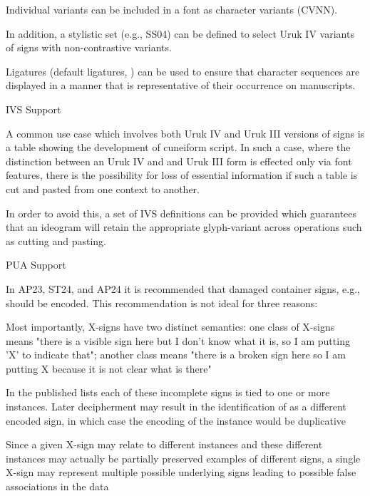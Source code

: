 \par Individual variants can be included in a font as character
      variants (CVNN).


\par In addition, a stylistic set (e.g., SS04) can
      be defined to select Uruk IV variants of signs with
      non-contrastive variants.


\par Ligatures (default ligatures, ) can be used
      to ensure that character sequences are displayed in a manner
      that is representative of their occurrence on manuscripts.

\Hhhh{}IVS Support


\par A common use case which involves both Uruk IV and Uruk III
      versions of signs is a table showing the development of
      cuneiform script.  In such a case, where the distinction between
      an Uruk IV and and Uruk III form is effected only via font
      features, there is the possibility for loss of essential
      information if such a table is cut and pasted from one context
      to another.


\par In order to avoid this, a set of IVS definitions can be
      provided which guarantees that an ideogram will retain the
      appropriate glyph-variant across operations such as cutting and
      pasting.

\Hhhh{}PUA Support


\par In AP23, ST24, and AP24 it is recommended that damaged
      container signs, e.g.,  should be
      encoded. This recommendation is not ideal for three
      reasons:

\Hol\Hli{}Most importantly, X-signs have two distinct semantics: one
	class of X-signs means "there is a visible sign here but I
	don't know what it is, so I am putting 'X' to indicate that";
	another class means "there is a broken sign here so I am
	putting X because it is not clear what is there"

\Hli{}In the published lists each of these incomplete signs is
	tied to one or more instances. Later decipherment may result in
	the identification of  as a different
	encoded sign, in which case the encoding of the instance would
	be duplicative

\Hli{}Since a given X-sign may relate to different instances and
	these different instances may actually be partially preserved
	examples of different signs, a single X-sign may represent
	multiple possible underlying signs leading to possible false
	associations in the data

